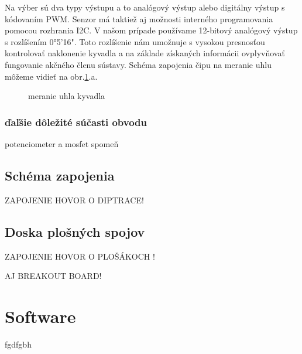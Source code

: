 Na výber sú dva typy výstupu a to analógový výstup alebo digitálny výstup s kódovaním PWM. Senzor má taktiež aj možnosti interného programovania pomocou rozhrania I2C.
V našom prípade používame 12-bitový analógový výstup s rozlíšením 0°5'16". Toto rozlíšenie nám umožnuje s vysokou presnosťou kontrolovať naklonenie kyvadla a na základe získaných informácii ovplyvňovať fungovanie akčného členu sústavy. Schéma zapojenia čipu na meranie uhlu môžeme vidieť na obr.\ref{OBRAZOK 2.2}.a.


\begin{figure}[!tbh]
\hfill
{}
\hfill
{}
\hfill
\caption{meranie uhla kyvadla}\label{OBRAZOK 2.2}
\end{figure}

\subsubsection{ďaľšie dôležité súčasti obvodu}
\label{ine}

potenciometer a mosfet spomeň

\subsection{Schéma zapojenia}

ZAPOJENIE HOVOR O DIPTRACE!

\subsection{Doska plošných spojov}

ZAPOJENIE HOVOR O PLOŠÁKOCH !

AJ BREAKOUT BOARD!

\section{Software}
fgdfgbh 
